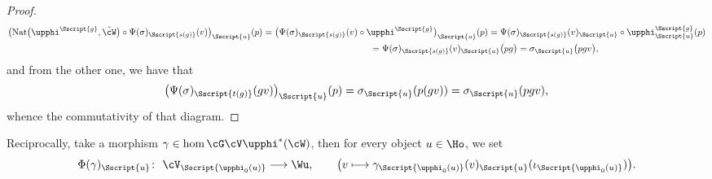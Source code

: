 \begin{proof}
\begin{gather*}
\big( {\rm Nat}\big(\upphi^{\Sscript{g}}, \tilde{\cW}\big) \circ \Psi(\sigma)_{\Sscript{s(g)}}(v) \big)_{\Sscript{u}}(p) = \big(\Psi(\sigma)_{\Sscript{s(g)}}(v) \circ \upphi^{\Sscript{g}}\big)_{\Sscript{u}}(p) =\Psi(\sigma)_{\Sscript{s(g)}}(v)_{\Sscript{u}} \circ
\upphi^{\Sscript{g}}_{\Sscript{u}}(p) \\
\hphantom{\big( {\rm Nat}\big(\upphi^{\Sscript{g}}, \tilde{\cW}\big) \circ \Psi(\sigma)_{\Sscript{s(g)}}(v) \big)_{\Sscript{u}}(p)}{} = \Psi(\sigma)_{\Sscript{s(g)}}(v)_{\Sscript{u}} \big(pg\big) =
\sigma_{\Sscript{u}} \big(pg v\big),
\end{gather*}
and from the other one, we have that
\begin{gather*}
\big( \Psi(\sigma)_{\Sscript{t(g)}}(gv)\big)_{\Sscript{u}}(p) = \sigma_{\Sscript{u}}(p(gv)) = \sigma_{\Sscript{u}}(pgv),
\end{gather*}
whence the commutativity of that diagram.
\end{proof}

Reciprocally, take a morphism $\gamma \in \hom{\cG}{\cV}{\upphi^*(\cW)}$, then for every object $u \in\Ho$,
we set
\begin{gather*}
\Phi(\gamma)_{\Sscript{u}}\colon \ \cV_{\Sscript{\upphi_{0}(u)}} \longrightarrow \Wu, \qquad \big( v \longmapsto \gamma_{\Sscript{\upphi_{0}(u)}}(v)_{\Sscript{u}}(\iota_{\Sscript{\upphi_{0}(u)}})\big).
\end{gather*}

